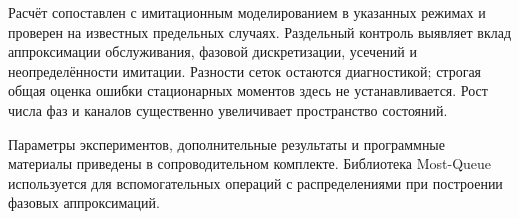 Расчёт сопоставлен с имитационным моделированием в указанных режимах и проверен на известных предельных случаях. Раздельный контроль выявляет вклад аппроксимации обслуживания, фазовой дискретизации, усечений и неопределённости имитации. Разности сеток остаются диагностикой; строгая общая оценка ошибки стационарных моментов здесь не устанавливается. Рост числа фаз и каналов существенно увеличивает пространство состояний.

Параметры экспериментов, дополнительные результаты и программные материалы приведены в сопроводительном комплекте. Библиотека Most-Queue \cite{mostqueue2026} используется для вспомогательных операций с распределениями при построении фазовых аппроксимаций.

